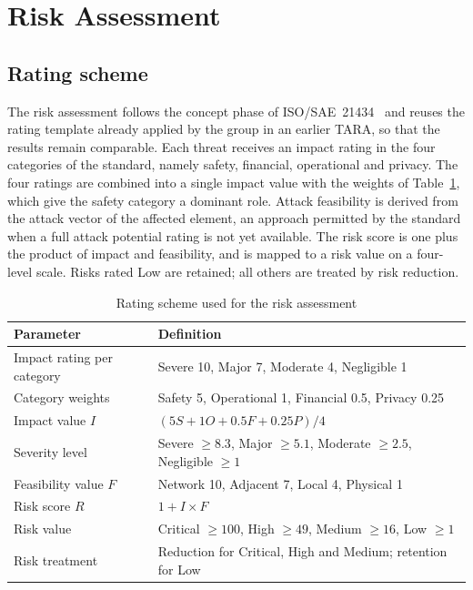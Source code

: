 \section{Risk Assessment}
\label{sec:risk-assessment}

\subsection{Rating scheme}

The risk assessment follows the concept phase of ISO/SAE~21434~\cite{iso21434}
and reuses the rating template already applied by the group in an earlier TARA,
so that the results remain comparable. Each threat receives an impact rating in
the four categories of the standard, namely safety, financial, operational and
privacy. The four ratings are combined into a single impact value with the
weights of Table~\ref{tab:scales}, which give the safety category a dominant
role. Attack feasibility is derived from the attack vector of the affected
element, an approach permitted by the standard when a full attack potential
rating is not yet available. The risk score is one plus the product of impact and
feasibility, and is mapped to a risk value on a four-level scale. Risks rated Low are retained;
all others are treated by risk reduction.

\begin{table}[htbp]
\centering
\caption{Rating scheme used for the risk assessment}
\label{tab:scales}
\footnotesize
\begin{tabularx}{\columnwidth}{lX}
\toprule
\textbf{Parameter} & \textbf{Definition} \\
\midrule
Impact rating per category & Severe 10, Major 7, Moderate 4, Negligible 1 \\
Category weights & Safety 5, Operational 1, Financial 0.5, Privacy 0.25 \\
Impact value $I$ & $(5S + 1O + 0.5F + 0.25P)/4$ \\
Severity level & Severe $\geq 8.3$, Major $\geq 5.1$, Moderate $\geq 2.5$, Negligible $\geq 1$ \\
Feasibility value $F$ & Network 10, Adjacent 7, Local 4, Physical 1 \\
Risk score $R$ & $1 + I \times F$ \\
Risk value & Critical $\geq 100$, High $\geq 49$, Medium $\geq 16$, Low $\geq 1$ \\
Risk treatment & Reduction for Critical, High and Medium; retention for Low \\
\bottomrule
\end{tabularx}
\end{table}

